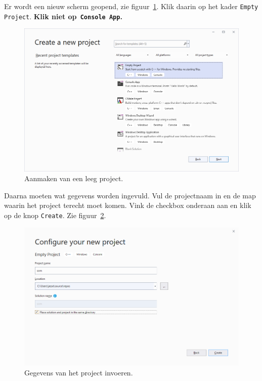 Er wordt een nieuw scherm geopend, zie figuur~\ref{fig:102create}. Klik daarin op het kader \texttt{Empty Project}. \textbf{Klik niet op\texttt{ Console App}.}

\begin{figure}[H]
\centering
\includegraphics[scale=\figscaleH]{images/102create}
\caption{Aanmaken van een leeg project.}
\label{fig:102create}
\end{figure}

Daarna moeten wat gegevens worden ingevuld. Vul de projectnaam in en de map waarin het project terecht moet komen. Vink de checkbox onderaan aan en klik op de knop \texttt{Create}. Zie figuur~\ref{fig:103configure}.

\begin{figure}[H]
\centering
\includegraphics[scale=\figscaleH]{images/103configure}
\caption{Gegevens van het project invoeren.}
\label{fig:103configure}
\end{figure}

